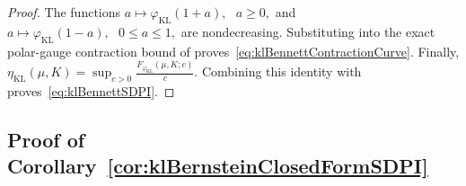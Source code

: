 \documentclass[11pt]{article}
\theoremstyle{plain}
\theoremstyle{remark}
\begin{document}
\begin{proof}
The functions $
     a\longmapsto
    \varphi_{\mathrm{KL}}(1+a),
   \text{ } a\geq0,$
and $ 
    a\longmapsto
    \varphi_{\mathrm{KL}}(1-a),
    \text{ } 0\leq a\leq1,$
are nondecreasing. Substituting
into the exact polar-gauge contraction bound of
proves~\eqref{eq:klBennettContractionCurve}. Finally, $
    \eta_{\mathrm{KL}}(\mu,K)
    =
    \sup_{c>0}
    \frac{
        F_{\varphi_{\mathrm{KL}}}(\mu,K;c)
    }{c}.$
Combining this identity with
proves~\eqref{eq:klBennettSDPI}.
\end{proof}

\subsection{Proof of Corollary~\ref{cor:klBernsteinClosedFormSDPI}}\label{app:proofKLBernsteinClosedFormSDPI}
\end{document}
